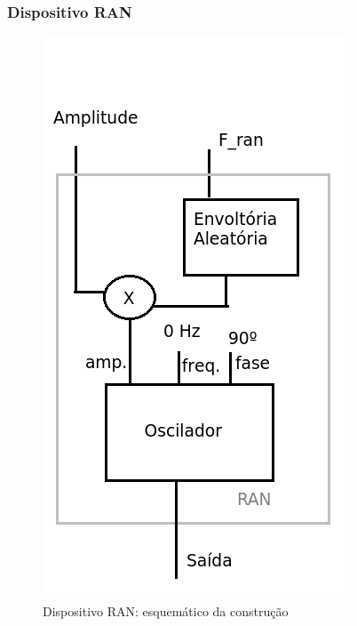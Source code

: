 \documentclass{beamer}
\begin{document}
\begin{frame}
 \frametitle{Dispositivo RAN}
 \begin{figure}
  \includegraphics[scale=0.3]{./images/RAN.png}
  \caption{Dispositivo RAN: esquemático da construção}
   \end{figure}
\end{frame}
\end{document}
